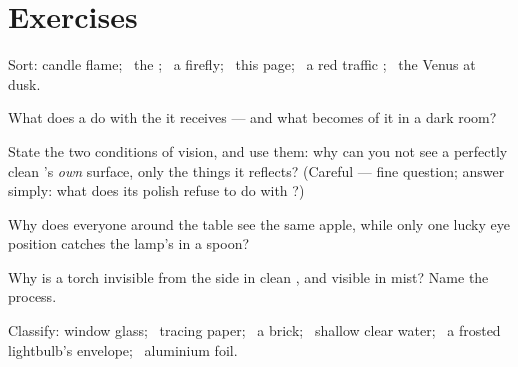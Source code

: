 \section{Exercises}

\begin{exercise}[$\star$]\label{exo:g7:light-sources-propagation:1}
Sort: candle flame; \ the ; \ a firefly; \ this page; \ a
red traffic ; \ the  Venus at dusk.
\end{exercise}

\begin{exercise}[$\star$]\label{exo:g7:light-sources-propagation:2}
What does a  do with the  it receives ---
and what becomes of it in a dark room?
\end{exercise}

\begin{exercise}[$\star$]\label{exo:g7:light-sources-propagation:3}
State the two conditions of vision, and use them: why can you
not see a perfectly clean 's \emph{own} surface, only the
things it reflects? (Careful --- fine question; answer simply:
what does its polish refuse to do with ?)
\end{exercise}

\begin{exercise}[$\star$]\label{exo:g7:light-sources-propagation:4}
Why does everyone around the table see the same apple, while
only one lucky eye position catches the lamp's  in a
spoon?
\end{exercise}

\begin{exercise}[$\star$]\label{exo:g7:light-sources-propagation:5}
Why is a torch  invisible from the side in clean , and
visible in mist? Name the process.
\end{exercise}

\begin{exercise}[$\star$]\label{exo:g7:light-sources-propagation:6}
Classify: window glass; \ tracing paper; \ a brick; \ shallow
clear water; \ a frosted lightbulb's envelope; \ aluminium
foil.
\end{exercise}

